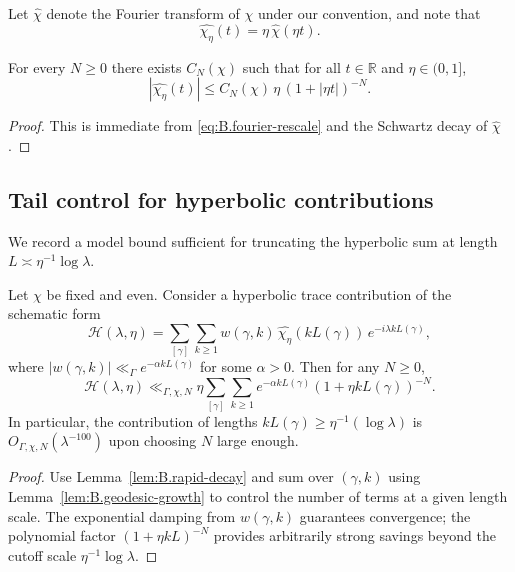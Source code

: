 Let $\widehat{\chi}$ denote the Fourier transform of $\chi$ under our convention, and note that
\begin{equation}
\label{eq:B.fourier-rescale}
\widehat{\chi_\eta}(t) = \eta\,\widehat{\chi}(\eta t).
\end{equation}

\begin{lemma}
\label{lem:B.rapid-decay}
For every $N\ge 0$ there exists $C_N(\chi)$ such that for all $t\in\mathbb{R}$ and $\eta\in(0,1]$,
\begin{equation}
\label{eq:B.rapid-decay}
|\widehat{\chi_\eta}(t)|
\le
C_N(\chi)\,\eta\,(1+|\eta t|)^{-N}.
\end{equation}
\end{lemma}

\begin{proof}
This is immediate from \eqref{eq:B.fourier-rescale} and the Schwartz decay of $\widehat{\chi}$.
\end{proof}

\subsection{Tail control for hyperbolic contributions}
\label{subsec:B.hyperbolic-tail}

We record a model bound sufficient for truncating the hyperbolic sum at length $L\asymp \eta^{-1}\log\lambda$.

\begin{proposition}
\label{prop:B.hyperbolic-tail}
Let $\chi$ be fixed and even.  Consider a hyperbolic trace contribution of the schematic form
\[
\mathcal{H}(\lambda,\eta)
=
\sum_{[\gamma]}\sum_{k\ge 1} w(\gamma,k)\,\widehat{\chi_\eta}(kL(\gamma))\,e^{-i\lambda kL(\gamma)},
\]
where $|w(\gamma,k)|\ll_\Gamma e^{-\alpha kL(\gamma)}$ for some $\alpha>0$.
Then for any $N\ge 0$,
\[
\mathcal{H}(\lambda,\eta)
\ll_{\Gamma,\chi,N}
\eta\sum_{[\gamma]}\sum_{k\ge 1} e^{-\alpha kL(\gamma)}(1+\eta kL(\gamma))^{-N}.
\]
In particular, the contribution of lengths $kL(\gamma)\ge \eta^{-1}(\log\lambda)$ is $O_{\Gamma,\chi,N}(\lambda^{-100})$
upon choosing $N$ large enough.
\end{proposition}

\begin{proof}
Use Lemma~\ref{lem:B.rapid-decay} and sum over $(\gamma,k)$ using Lemma~\ref{lem:B.geodesic-growth} to control the
number of terms at a given length scale.  The exponential damping from $w(\gamma,k)$ guarantees convergence; the
polynomial factor $(1+\eta kL)^{-N}$ provides arbitrarily strong savings beyond the cutoff scale $\eta^{-1}\log\lambda$.
\end{proof}

